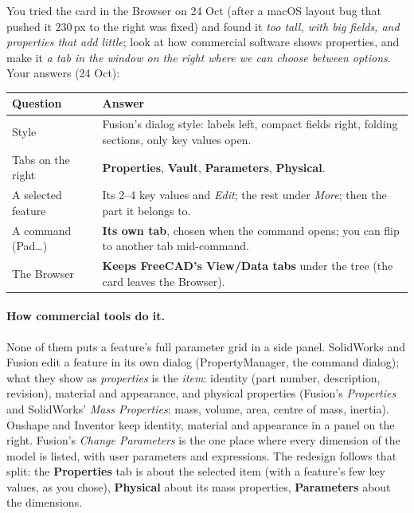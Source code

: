 You tried the card in the Browser on 24 Oct (after a macOS layout bug that pushed it 230\,px to the right was
fixed) and found it \emph{too tall, with big fields, and properties that add little}; look at how commercial
software shows properties, and make it \emph{a tab in the window on the right where we can choose between
options}. Your answers (24 Oct):
\begin{center}
\small
\begin{tabularx}{\linewidth}{@{}lX@{}}
\toprule
Question & Answer\\
\midrule
Style & Fusion's dialog style: labels left, compact fields right, folding sections, only key values open.\\
Tabs on the right & \textbf{Properties}, \textbf{Vault}, \textbf{Parameters}, \textbf{Physical}.\\
A selected feature & Its 2--4 key values and \emph{Edit}; the rest under \emph{More}; then the part it belongs to.\\
A command (Pad\ldots) & \textbf{Its own tab}, chosen when the command opens; you can flip to another tab mid-command.\\
The Browser & \textbf{Keeps FreeCAD's View/Data tabs} under the tree (the card leaves the Browser).\\
\bottomrule
\end{tabularx}
\end{center}

\paragraph{How commercial tools do it.} None of them puts a feature's full parameter grid in a side panel.
SolidWorks and Fusion edit a feature in its own dialog (PropertyManager, the command dialog); what they show as
\emph{properties} is the \emph{item}: identity (part number, description, revision), material and appearance, and
physical properties (Fusion's \emph{Properties} and SolidWorks' \emph{Mass Properties}: mass, volume, area, centre
of mass, inertia). Onshape and Inventor keep identity, material and appearance in a panel on the right. Fusion's
\emph{Change Parameters} is the one place where every dimension of the model is listed, with user parameters and
expressions. The redesign follows that split: the \textbf{Properties} tab is about the selected item (with a feature's
few key values, as you chose), \textbf{Physical} about its mass properties, \textbf{Parameters} about the dimensions.

